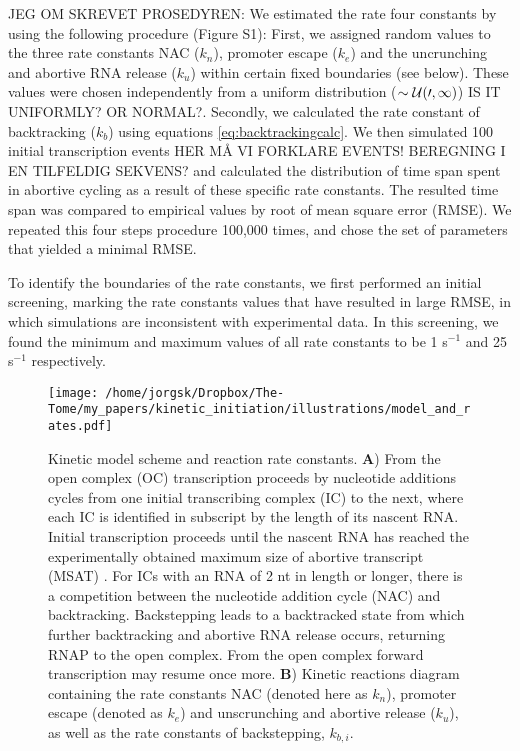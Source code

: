 JEG OM SKREVET PROSEDYREN: We estimated the rate four constants by using the
following procedure (Figure S1): First, we assigned random values to the three
rate constants NAC ($k_n$), promoter escape ($k_e$) and the uncrunching and
abortive RNA release ($k_u$) within certain fixed boundaries (see below).
These values were chosen independently from a uniform distribution ($\sim \cal
U (0,1)$) IS IT UNIFORMLY? OR NORMAL?. Secondly, we calculated the rate
constant of backtracking ($k_b$) using equations \ref{eq:backtrackingcalc}. We
then simulated 100 initial transcription events HER MÅ VI FORKLARE EVENTS!
BEREGNING I EN TILFELDIG SEKVENS? and calculated the distribution of time span
spent in abortive cycling as a result of these specific rate constants. The
resulted time span was compared to empirical values
\cite{revyakin_abortive_2006} by root of mean square error (RMSE). We repeated
this four steps procedure 100,000 times, and chose the set of parameters that
yielded a minimal RMSE.  

To identify the boundaries of the rate constants, we first performed an
initial screening, marking the rate constants values that have resulted in
large RMSE, in which simulations are inconsistent with experimental data. In
this screening, we found the minimum and maximum values of all rate constants
to be 1 s$^{-1}$ and 25 s$^{-1}$ respectively. 

\begin{figure}
	\begin{center}
        \texttt{[image: /home/jorgsk/Dropbox/The-Tome/my\_papers/kinetic\_initiation/illustrations/model\_and\_rates.pdf]}

	\end{center}
    \caption{Kinetic model scheme and reaction rate constants.  \textbf{A})
    From the open complex (OC) transcription proceeds by nucleotide additions
    cycles from one initial transcribing complex (IC) to the next, where each
    IC is identified in subscript by the length of its nascent RNA. Initial
    transcription proceeds until the nascent RNA has reached the
    experimentally obtained maximum size of abortive transcript (MSAT)
    \cite{hsu_initial_2006}. For ICs with an RNA of 2 nt in length or longer, there is a
    competition between the nucleotide addition cycle (NAC) and backtracking.
    Backstepping leads to a backtracked state from which further backtracking
    and abortive RNA release occurs, returning RNAP to the open complex. From
    the open complex forward transcription may resume once more. \textbf{B})
    Kinetic reactions diagram containing the rate
    constants NAC (denoted here as $k_n$), promoter escape (denoted as $k_e$) and unscrunching and abortive
    release ($k_u$), as well as the rate constants of backstepping, $k_{b,i}$.}
    \label{fig:model_and_rates}
\end{figure}
